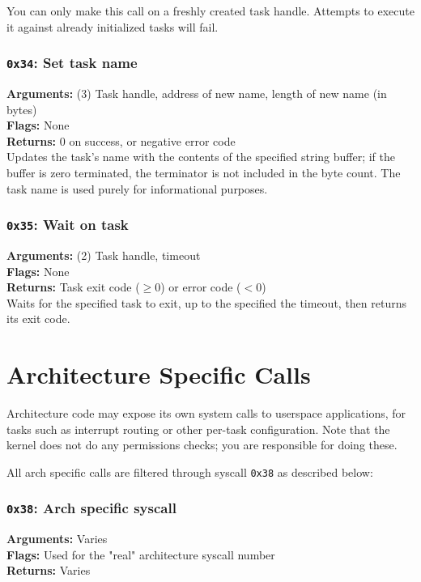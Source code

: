 \documentclass[11pt]{article}
\begin{document}
You can only make this call on a freshly created task handle. Attempts to execute it against already initialized tasks will fail.

\subsubsection{{\tt 0x34}: Set task name}
\textbf{Arguments:} (3) Task handle, address of new name, length of new name (in bytes) \\
\textbf{Flags:} None \\
\textbf{Returns:} 0 on success, or negative error code \\

Updates the task's name with the contents of the specified string buffer; if the buffer is zero terminated, the terminator is not included in the byte count. The task name is used purely for informational purposes.

\subsubsection{{\tt 0x35}: Wait on task}
\textbf{Arguments:} (2) Task handle, timeout \\
\textbf{Flags:} None \\
\textbf{Returns:} Task exit code ($\geq0$) or error code ($<0$) \\

Waits for the specified task to exit, up to the specified the timeout, then returns its exit code.





\section{Architecture Specific Calls}
Architecture code may expose its own system calls to userspace applications, for tasks such as interrupt routing or other per-task configuration. Note that the kernel does not do any permissions checks; you are responsible for doing these.

All arch specific calls are filtered through syscall \texttt{0x38} as described below:

\subsubsection{{\tt 0x38}: Arch specific syscall}
\textbf{Arguments:} Varies \\
\textbf{Flags:} Used for the "real" architecture syscall number \\
\textbf{Returns:} Varies \\
\end{document}
